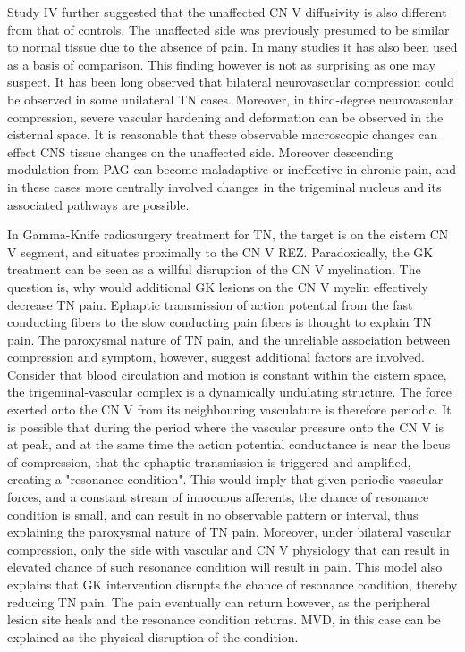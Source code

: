 Study IV further suggested that the unaffected CN V diffusivity is also different from that of controls. The unaffected side was previously presumed to be similar to normal tissue due to the absence of pain. In many studies it has also been used as a basis of comparison. This finding however is not as surprising as one may suspect. It has been long observed that bilateral neurovascular compression could be observed in some unilateral TN cases. Moreover, in third-degree neurovascular compression, severe vascular hardening and deformation can be observed in the cisternal space. It is reasonable that these observable macroscopic changes can effect CNS tissue changes on the unaffected side. Moreover descending modulation from PAG can become maladaptive or ineffective in chronic pain, and in these cases more centrally involved changes in the trigeminal nucleus and its associated pathways are possible.

In Gamma-Knife radiosurgery treatment for TN, the target is on the cistern CN V segment, and situates proximally to the CN V REZ. Paradoxically, the GK treatment can be seen as a willful disruption of the CN V myelination. The question is, why would additional GK lesions on the CN V myelin effectively decrease TN pain. Ephaptic transmission of action potential from the fast conducting fibers to the slow conducting pain fibers is thought to explain TN pain. The paroxysmal nature of TN pain, and the unreliable association between compression and symptom, however, suggest additional factors are involved. Consider that blood circulation and motion is constant within the cistern space, the trigeminal-vascular complex is a dynamically undulating structure. The force exerted onto the CN V from its neighbouring vasculature is therefore periodic. It is possible that during the period where the vascular pressure onto the CN V is at peak, and at the same time the action potential conductance is near the locus of compression, that the ephaptic transmission is triggered and amplified, creating a "resonance condition". This would imply that given periodic vascular forces, and a constant stream of innocuous afferents, the chance of resonance condition is small, and can result in no observable pattern or interval, thus explaining the paroxysmal nature of TN pain. Moreover, under bilateral vascular compression, only the side with vascular and CN V physiology that can result in elevated chance of such resonance condition will result in pain. This model also explains that GK intervention disrupts the chance of resonance condition, thereby reducing TN pain. The pain eventually can return however, as the peripheral lesion site heals and the resonance condition returns. MVD, in this case can be explained as the physical disruption of the condition.

